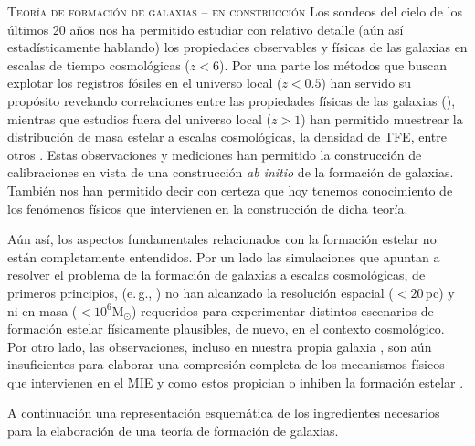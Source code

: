 \documentclass[xcolor=dvipsnames,4pt,hyperref={colorlinks,citecolor=black,linkcolor=black,urlcolor=black}]{beamer}
\begin{document}
\begin{frame}[allowframebreaks]{\textsc{Teoría de formación de galaxias -- en construcción}}
Los sondeos del cielo de los últimos 20 años nos ha permitido estudiar con relativo detalle (aún así
estadísticamente hablando) los propiedades observables y físicas de las galaxias en escalas de
tiempo cosmológicas ($z<6$). Por una parte los métodos que buscan explotar los registros fósiles en
el universo local ($z<0.5$) han servido su propósito revelando correlaciones entre las propiedades
físicas de las galaxias (\cites[la relación masa-metalicidad,][]{Tremonti2004, Sanchez2013}[la
relación edad-metalicidad,][]{Worthey1994, Gallazzi2005, Panter2008}), mientras que estudios fuera
del universo local ($z>1$) han permitido muestrear la distribución de masa estelar a escalas
cosmológicas, la densidad de TFE, entre otros \citep[véase][para una revisión completa]{Madau2014}.
Estas observaciones y mediciones han permitido la construcción de calibraciones en vista de una
construcción \emph{ab initio} de la formación de galaxias. También nos han permitido decir con
certeza que hoy tenemos conocimiento de los fenómenos físicos que intervienen en la construcción de
dicha teoría.

Aún así, los aspectos fundamentales relacionados con la formación estelar no están completamente
entendidos. Por un lado las simulaciones que apuntan a resolver el problema de la formación de
galaxias a escalas cosmológicas, de primeros principios, (e.\,g.,
\cites[\textsc{millenium}][]{Springel2005c}[\textsc{illustris}][]{Vogelsberger2014}) no han
alcanzado la resolución espacial ($<20\,$pc) y ni en masa ($<10^6$M$_\odot$) requeridos para
experimentar distintos escenarios de formación estelar físicamente plausibles, de nuevo, en el
contexto cosmológico. Por otro lado, las observaciones, incluso en nuestra propia galaxia
\citep[e.\,g.][]{}, son aún insuficientes para elaborar una compresión completa de los mecanismos
físicos que intervienen en el MIE y como estos propician o inhiben la formación estelar
\citep[véase][para una revisión]{Naab2016}.

A continuación una representación esquemática de los ingredientes necesarios para la elaboración de
una teoría de formación de galaxias.
%
%
%
\end{frame}
\end{document}
